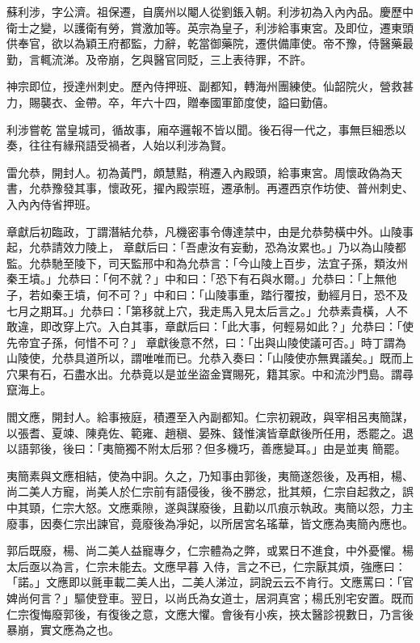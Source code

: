\begin{pinyinscope}
 蘇利涉，字公濟。祖保遷，自廣州以閹人從劉鋹入朝。利涉初為入內內品。慶歷中衛士之變，以護衛有勞，賞激加等。英宗為皇子，利涉給事東宮。及即位，遷東頭供奉官，欲以為穎王府都監，力辭，乾當御藥院，遷供備庫使。帝不豫，侍醫藥最勤，言輒流涕。及帝崩，乞與醫官同貶，三上表待罪，不許。



 神宗即位，授達州刺史。歷內侍押班、副都知，轉海州團練使。仙韶院火，營救甚力，賜襲衣、金帶。卒，年六十四，贈奉國軍節度使，謚曰勤僖。



 利涉嘗乾
 當皇城司，循故事，廂卒邏報不皆以聞。後石得一代之，事無巨細悉以奏，往往有緣飛語受禍者，人始以利涉為賢。



 雷允恭，開封人。初為黃門，頗慧黠，稍遷入內殿頭，給事東宮。周懷政偽為天書，允恭豫發其事，懷政死，擢內殿崇班，遷承制。再遷西京作坊使、普州刺史、入內內侍省押班。



 章獻后初臨政，丁謂潛結允恭，凡機密事令傳達禁中，由是允恭勢橫中外。山陵事起，允恭請效力陵上，
 章獻后曰：「吾慮汝有妄動，恐為汝累也。」乃以為山陵都監。允恭馳至陵下，司天監邢中和為允恭言：「今山陵上百步，法宜子孫，類汝州秦王墳。」允恭曰：「何不就？」中和曰：「恐下有石與水爾。」允恭曰：「上無他子，若如秦王墳，何不可？」中和曰：「山陵事重，踏行覆按，動經月日，恐不及七月之期耳。」允恭曰：「第移就上穴，我走馬入見太后言之。」允恭素貴橫，人不敢違，即改穿上穴。入白其事，章獻后曰：「此大事，何輕易如此？」允恭曰：「使先帝宜子孫，何惜不可？」
 章獻後意不然，曰：「出與山陵使議可否。」時丁謂為山陵使，允恭具道所以，謂唯唯而已。允恭入奏曰：「山陵使亦無異議矣。」既而上穴果有石，石盡水出。允恭竟以是並坐盜金寶賜死，籍其家。中和流沙門島。謂尋竄海上。



 閻文應，開封人。給事掖庭，積遷至入內副都知。仁宗初親政，與宰相呂夷簡謀，以張耆、夏竦、陳堯佐、範雍、趙稹、晏殊、錢惟演皆章獻後所任用，悉罷之。退以語郭後，後曰：「夷簡獨不附太后邪？但多機巧，善應變耳。」由是並夷
 簡罷。



 夷簡素與文應相結，使為中詗。久之，乃知事由郭後，夷簡遂怨後，及再相，楊、尚二美人方寵，尚美人於仁宗前有語侵後，後不勝忿，批其頰，仁宗自起救之，誤中其頸，仁宗大怒。文應乘隙，遂與謀廢後，且勸以爪痕示執政。夷簡以怨，力主廢事，因奏仁宗出諫官，竟廢後為凈妃，以所居宮名瑤華，皆文應為夷簡內應也。



 郭后既廢，楊、尚二美人益寵專夕，仁宗體為之弊，或累日不進食，中外憂懼。楊太后亟以為言，仁宗未能去。文應早暮
 入侍，言之不已，仁宗厭其煩，強應曰：「諾。」文應即以氈車載二美人出，二美人涕泣，詞說云云不肯行。文應罵曰：「官婢尚何言？」驅使登車。翌日，以尚氏為女道士，居洞真宮；楊氏別宅安置。既而仁宗復悔廢郭後，有復後之意，文應大懼。會後有小疾，挾太醫診視數日，乃言後暴崩，實文應為之也。




\end{pinyinscope}
